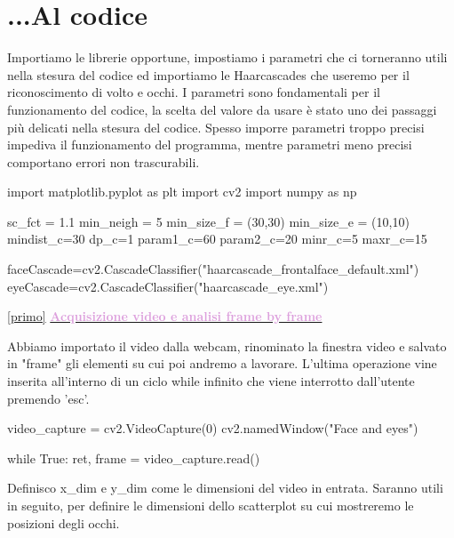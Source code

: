 \documentclass[12pt]{article}
\begin{document}
{\pagebreak
\section{...Al codice}
\vspace{1cm}
Importiamo le librerie opportune, impostiamo i parametri che ci torneranno utili nella stesura del codice ed importiamo le Haarcascades che useremo per il riconoscimento di volto e occhi. I parametri sono fondamentali per il funzionamento del codice, la scelta del valore da usare \`e stato uno dei passaggi pi\`u delicati nella stesura del codice. Spesso imporre parametri troppo precisi impediva il funzionamento del programma, mentre parametri meno precisi comportano errori non trascurabili.
\vspace{1cm}
\begin{codice}
import matplotlib.pyplot as plt
import cv2
import numpy as np

sc_fct = 1.1              
min_neigh = 5             
min_size_f = (30,30)      
min_size_e = (10,10)        
mindist_c=30               
dp_c=1                   
param1_c=60               
param2_c=20              
minr_c=5                
maxr_c=15                 


faceCascade=cv2.CascadeClassifier("haarcascade_frontalface_default.xml")
eyeCascade=cv2.CascadeClassifier("haarcascade_eye.xml")
\end{codice}

\vspace{2cm}
\ref {primo} \underline{\textbf{\textcolor{Plum}{Acquisizione video e analisi frame by frame}}}

\vspace{1cm}
Abbiamo importato il video dalla webcam, rinominato la finestra video e salvato in "frame" gli elementi su cui poi andremo a lavorare. L'ultima operazione vine inserita all'interno di un ciclo while infinito che viene interrotto dall'utente premendo 'esc'.

\vspace{1cm}
    \begin{codice}
video_capture = cv2.VideoCapture(0)
cv2.namedWindow("Face and eyes")
    
while True:
    ret, frame = video_capture.read()
    \end{codice}

\vspace{1cm}
    
 Definisco x\_dim e y\_dim come le dimensioni del video in entrata. Saranno utili in seguito, per definire le dimensioni dello scatterplot su cui mostreremo le posizioni degli occhi. 
 
}
\end{document}
